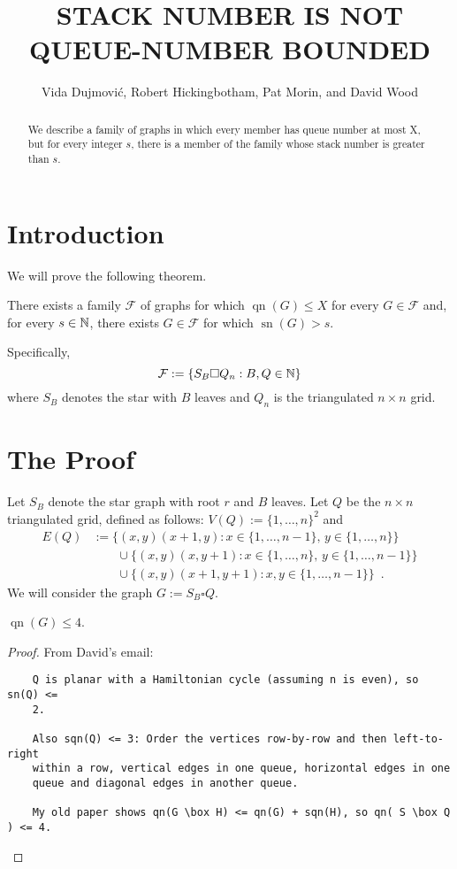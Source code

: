 \documentclass[kpfonts]{patmorin}
\title{\MakeUppercase{Stack Number is not Queue-Number Bounded}}
\author{Vida Dujmović, Robert Hickingbotham, Pat Morin, and David Wood}
\DeclareMathOperator{\sn}{sn}
\DeclareMathOperator{\qn}{qn}
\begin{document}
\maketitle

\begin{abstract}
  We describe a family of graphs in which every member has queue number at most X, but for every integer $s$, there is a member of the family whose stack number is greater than $s$.
\end{abstract}

\section{Introduction}

We will prove the following theorem.

\begin{thm}
  There exists a family $\mathcal{F}$ of graphs for which $\qn(G)\le X$ for every $G\in\mathcal{F}$ and, for every $s\in\mathbb{N}$, there exists $G\in\mathcal{F}$ for which $\sn(G)>s$.
\end{thm}

Specifically,
\[
    \mathcal{F} := \{ S_B\square Q_n : B,Q\in\mathbb{N}\}
\]
where $S_B$ denotes the star with $B$ leaves and $Q_n$ is the triangulated $n\times n$ grid.

\section{The Proof}

Let $S_B$ denote the star graph with root $r$ and $B$ leaves.  Let $Q$ be the $n\times n$ triangulated grid, defined as follows: $V(Q):=\{1,\ldots,n\}^2$ and
\begin{align*}
    E(Q) & :=\{(x,y)(x+1,y):x\in\{1,\ldots,n-1\},\,y\in\{1,\ldots,n\}\} \\
        & \qquad \cup \{(x,y)(x,y+1):x\in\{1,\ldots,n\},\,y\in\{1,\ldots,n-1\}\} \\
        & \qquad \cup \{(x,y)(x+1,y+1):x,y\in\{1,\ldots,n-1\}\} \enspace .
\end{align*}
We will consider the graph $G:=S_B\square Q$.

\begin{lem}
    $\qn(G) \le 4$.
\end{lem}

\begin{proof}
From David's email:
\begin{verbatim}
    Q is planar with a Hamiltonian cycle (assuming n is even), so sn(Q) <=
    2.

    Also sqn(Q) <= 3: Order the vertices row-by-row and then left-to-right
    within a row, vertical edges in one queue, horizontal edges in one
    queue and diagonal edges in another queue.

    My old paper shows qn(G \box H) <= qn(G) + sqn(H), so qn( S \box Q ) <= 4.\end{verbatim}
\end{proof}
\end{document}

